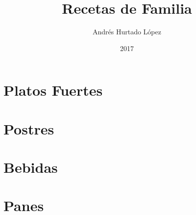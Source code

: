 \documentclass[letterpaper]{book}
\begin{document}
\title{Recetas de Familia}
\author{Andrés Hurtado López}
\date{2017}

\frontmatter



\tableofcontents
\mainmatter
\part{Platos Fuertes}


%
%
%
%
%
%
%
%
%
%
%
%
%
%
%
%
%
%
%
%
%
%
%
%
%
%
%
%
%
%
%
%
%
%
%
%
%
%
%
%
%
%
%
%
%
%
%
%
%
%
%
%
%
%

\part{Postres}
%
%
%
%
%
%
\part{Bebidas}
%
\part{Panes}
%
\backmatter

\end{document}
